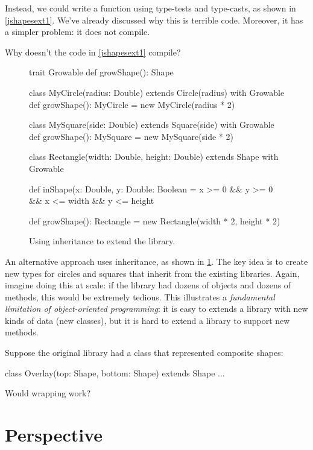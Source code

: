 \documentclass{book}
\begin{document}
Instead, we could write a  function using
type-tests and type-casts, as shown in \cref{jshapesext1}. We've already
discussed why this is terrible code. Moreover, it has a simpler problem: it
does not compile.

\begin{think}
Why doesn't the code in \cref{jshapesext1} compile?
\end{think}

\begin{figure}
\begin{scalacode}
trait Growable {
  def growShape(): Shape
}

class MyCircle(radius: Double) extends Circle(radius) with Growable {
  def growShape(): MyCircle = new MyCircle(radius * 2)
}

class MySquare(side: Double) extends Square(side) with Growable {
  def growShape(): MySquare = new MySquare(side * 2)
}

class Rectangle(width: Double, height: Double) extends Shape with Growable {
  def inShape(x: Double, y: Double: Boolean = x >= 0 && y >= 0 && x <= width && y <= height

  def growShape(): Rectangle = new Rectangle(width * 2, height * 2)
}
\end{scalacode}
\caption{Using inheritance to extend the library.}
\label{jshapesext2}
\end{figure}

An alternative approach uses inheritance, as shown
in \cref{jshapesext2}. The key idea is to create  new types for circles
and squares that inherit from the existing libraries.
Again, imagine doing this at scale: if the library had dozens of objects
and dozens of methods, this would be extremely tedious.
 This illustrates a \emph{fundamental limitation of
object-oriented programming}: it is easy to extends a library with new
kinds of data (new classes), but it is hard to extend a library to support
new methods.

\begin{think}
Suppose the original library had a class that represented composite
shapes:
\begin{scalacode}
class Overlay(top: Shape, bottom: Shape) extends Shape { ... }
\end{scalacode}
Would wrapping work?
\end{think}

\section{Perspective}
\end{document}
